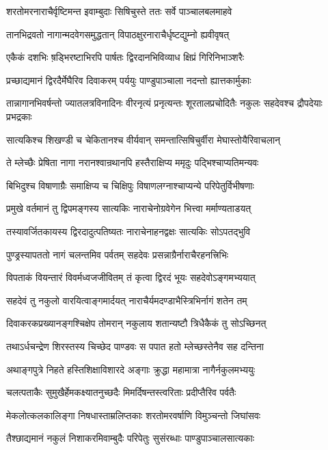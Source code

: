 \twolineshloka
{शरतोमरनाराचैर्वृष्टिमन्त इवाम्बुदाः}
{सिषिचुस्ते ततः सर्वे पाञ्चालबलमाहवे}


\twolineshloka
{तानभिद्रवतो नागान्मदवेगसमुद्धतान्}
{विपाठक्षुरनाराचैर्धृष्टद्युम्नो ह्यवीवृषत्}


\twolineshloka
{एकैकं दशभिः ष़ड्भिरष्टाभिरपि पार्षतः}
{द्विरदानभिविव्याध क्षिप्रं गिरिनिभाञ्शरैः}


\twolineshloka
{प्रच्छाद्यमानं द्विरदैर्मेघैरिव दिवाकरम्}
{पर्ययुः पाण्डुपाञ्चाला नदन्तो ह्यात्तकार्मुकाः}


\threelineshloka
{तान्नागानभिवर्षन्तो ज्यातलत्रविनादिनः}
{वीरनृत्यं प्रनृत्यन्तः शूरतालप्रचोदितैः}
{नकुलः सहदेवश्च द्रौपदेयाः प्रभद्रकाः}


\twolineshloka
{सात्यकिश्च शिखण्डी च चेकितानश्च वीर्यवान्}
{समन्तात्सिषिचुर्वीरा मेघास्तोयैरिवाचलान्}


\twolineshloka
{ते म्लेच्छैः प्रेषिता नागा नरानश्वान्रथानपि}
{हस्तैराक्षिप्य ममृदुः पद्भिश्चाप्यतिमन्यवः}


\twolineshloka
{बिभिदुश्च विषाणाग्रैः समाक्षिप्य च चिक्षिपुः}
{विषाणलग्नाश्चाप्यन्ये परिपेतुर्विभीषणाः}


\twolineshloka
{प्रमुखे वर्तमानं तु द्विपमङ्गस्य सात्यकिः}
{नाराचेनोग्रवेगेन भित्त्वा मर्माण्यताडयत्}


\twolineshloka
{तस्यावर्जितकायस्य द्विरदादुत्पतिष्यतः}
{नाराचेनाहनद्वक्षः सात्यकिः सोऽपतद्भुवि}


\twolineshloka
{पुण्ड्रस्यापततो नागं चलन्तमिव पर्वतम्}
{सहदेवः प्रसन्नाग्रैर्नाराचैरहनत्त्रिभिः}


\twolineshloka
{विपताकं वियन्तारं विवर्मध्वजजीवितम्}
{तं कृत्वा द्विरदं भूयः सहदेवोऽङ्गमभ्ययात्}


\twolineshloka
{सहदेवं तु नकुलो वारयित्वाङ्गमार्दयत्}
{नाराचैर्यमदण्डाभैस्त्रिभिर्नागं शतेन तम्}


\twolineshloka
{दिवाकरकप्रख्यानङ्गश्चिक्षेप तोमरान्}
{नकुलाय शतान्यष्टौ त्रिधैकैकं तु सोऽच्छिनत्}


\twolineshloka
{तथाऽर्धचन्द्रेण शिरस्तस्य चिच्छेद पाण्डवः}
{स पपात हतो म्लेच्छस्तेनैव सह दन्तिना}


\twolineshloka
{अथाङ्गपुत्रे निहते हस्तिशिक्षाविशारदे}
{अङ्गाः क्रुद्धा महामात्रा नागैर्नकुलमभ्ययुः}


\twolineshloka
{चलत्पताकैः सुमुखैर्हेमकक्ष्यातनुच्छदैः}
{मिमर्दिषन्तस्त्वरिताः प्रदीप्तैरिव पर्वतैः}


\twolineshloka
{मेकलोत्कलकालिङ्गा निषधास्ताम्रलिप्तकाः}
{शरतोमरवर्षाणि विमुञ्चन्तो जिघांसवः}


\twolineshloka
{तैश्छाद्यमानं नकुलं निशाकरमिवाम्बुदैः}
{परिपेतुः सुसंरब्धाः पाण्डुपाञ्चालसात्यकाः}



